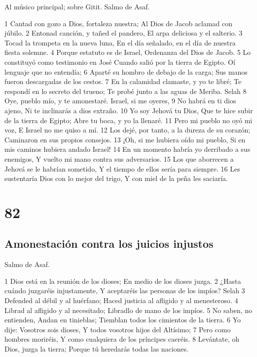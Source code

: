 Al músico principal; sobre Gitit. Salmo de Asaf.

1 Cantad con gozo a Dios, fortaleza nuestra;
Al Dios de Jacob aclamad con júbilo.
2 Entonad canción, y tañed el pandero,
El arpa deliciosa y el salterio.
3 Tocad la trompeta en la nueva luna,
En el día señalado, en el día de nuestra fiesta solemne.
4 Porque estatuto es de Israel,
Ordenanza del Dios de Jacob.
5 Lo constituyó como testimonio en José
Cuando salió por la tierra de Egipto.
Oí lenguaje que no entendía;
6 Aparté su hombro de debajo de la carga;
Sus manos fueron descargadas de los cestos.
7 En la calamidad clamaste, y yo te libré;
Te respondí en lo secreto del trueno;
Te probé junto a las aguas de Meriba. Selah
8 Oye, pueblo mío, y te amonestaré.
Israel, si me oyeres,
9 No habrá en ti dios ajeno,
Ni te inclinarás a dios extraño.
10 Yo soy Jehová tu Dios,
Que te hice subir de la tierra de Egipto;
Abre tu boca, y yo la llenaré.
11 Pero mi pueblo no oyó mi voz,
E Israel no me quiso a mí.
12 Los dejé, por tanto, a la dureza de su corazón;
Caminaron en sus propios consejos.
13 ¡Oh, si me hubiera oído mi pueblo,
Si en mis caminos hubiera andado Israel!
14 En un momento habría yo derribado a sus enemigos,
Y vuelto mi mano contra sus adversarios.
15 Los que aborrecen a Jehová se le habrían sometido,
Y el tiempo de ellos sería para siempre.
16 Les sustentaría Dios con lo mejor del trigo,
Y con miel de la peña les saciaría.

\chapter{82}

\section*{Amonestación contra los juicios injustos}

Salmo de Asaf.

1 Dios está en la reunión de los dioses;
En medio de los dioses juzga.
2 ¿Hasta cuándo juzgaréis injustamente,
Y aceptaréis las personas de los impíos? Selah
3 Defended al débil y al huérfano;
Haced justicia al afligido y al menesteroso.
4 Librad al afligido y al necesitado;
Libradlo de mano de los impíos.
5 No saben, no entienden,
Andan en tinieblas;
Tiemblan todos los cimientos de la tierra.
6 Yo dije: Vosotros sois dioses,
Y todos vosotros hijos del Altísimo;
7 Pero como hombres moriréis,
Y como cualquiera de los príncipes caeréis.
8 Levántate, oh Dios, juzga la tierra;
Porque tú heredarás todas las naciones.

